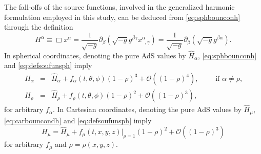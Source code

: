 \documentclass[a4paper,11pt]{article}
\numberwithin{equation}{section}
\begin{document}
The fall-offs of the source functions, involved in the generalized harmonic formulation employed in this study, can be deduced from \eqref{eq:sphbounconh}
through the definition 
\begin{equation}\label{eq:defsoufunsph}
H^\alpha \equiv \Box x^\alpha = \frac{1}{\sqrt{-g}}\partial_\beta (\sqrt{-g}g^{\beta\gamma}x^\alpha_{\;\;,\gamma})=\frac{1}{\sqrt{-g}}\partial_\beta (\sqrt{-g}g^{\beta\alpha}).
\end{equation}
In spherical coordinates, denoting the pure AdS values by $\hat{H}_\alpha$, \eqref{eq:sphbounconh} and \eqref{eq:defsoufunsph} imply
\begin{eqnarray}\label{eq:sphbouncondsoufunc}
H_\alpha&=&\hat{H}_\alpha+f_\alpha(t,\theta,\phi)(1-\rho)^3+\mathcal{O}((1-\rho)^4), \qquad \textrm{ if $\alpha\neq\rho$,} \\ \nonumber
H_\rho&=&\hat{H}_\rho+f_\rho(t,\theta,\phi)(1-\rho)^2+\mathcal{O}((1-\rho)^3),
\end{eqnarray}
for arbitrary $f_\alpha$.
In Cartesian coordinates,  denoting the pure AdS values by $\hat{H}_\mu$, \eqref{eq:carbouncondh} and \eqref{eq:defsoufunsph} imply
\begin{equation}\label{eq:carbouncondsoufun}
H_\mu=\hat{H}_\mu+f_\mu(t,x,y,z)|_{\rho=1}(1-\rho)^2+\mathcal{O}((1-\rho)^3)
\end{equation}
for arbitrary $f_\mu$ and $\rho=\rho(x,y,z)$.




\end{document}
